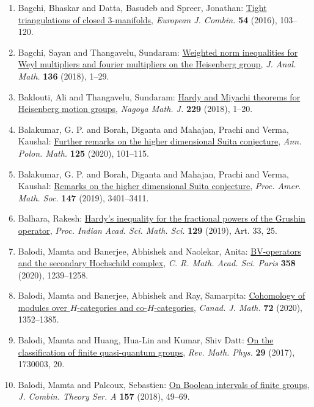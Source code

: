 \begin{enumerate}
\item Bagchi, Bhaskar and Datta, Basudeb and Spreer, Jonathan: \href{https://doi.org/10.1016/j.ejc.2015.12.006}{Tight triangulations of closed 3-manifolds}, \emph{European J. Combin.} {\bf 54} (2016), 103--120.
\item Bagchi, Sayan and Thangavelu, Sundaram: \href{https://doi.org/10.1007/s11854-018-0053-8}{Weighted norm inequalities for {W}eyl multipliers and fourier
multipliers on the {H}eisenberg group}, \emph{J. Anal. Math.} {\bf 136} (2018), 1--29.
\item Baklouti, Ali and Thangavelu, Sundaram: \href{https://doi.org/10.1017/nmj.2016.58}{Hardy and {M}iyachi theorems for {H}eisenberg motion groups}, \emph{Nagoya Math. J.} {\bf 229} (2018), 1--20.
\item Balakumar, G. P. and Borah, Diganta and Mahajan, Prachi and
Verma, Kaushal: \href{https://doi.org/10.4064/ap200203-21-4}{Further remarks on the higher dimensional {S}uita conjecture}, \emph{Ann. Polon. Math.} {\bf 125} (2020), 101--115.
\item Balakumar, G. P. and Borah, Diganta and Mahajan, Prachi and
Verma, Kaushal: \href{https://doi.org/10.1090/proc/14421}{Remarks on the higher dimensional {S}uita conjecture}, \emph{Proc. Amer. Math. Soc.} {\bf 147} (2019), 3401--3411.
\item Balhara, Rakesh: \href{https://doi.org/10.1007/s12044-019-0471-2}{Hardy's inequality for the fractional powers of the {G}rushin
operator}, \emph{Proc. Indian Acad. Sci. Math. Sci.} {\bf 129} (2019), Art. 33, 25.
\item Balodi, Mamta and Banerjee, Abhishek and Naolekar, Anita: \href{https://doi.org/10.5802/crmath.157}{B{V}-operators and the secondary {H}ochschild complex}, \emph{C. R. Math. Acad. Sci. Paris} {\bf 358} (2020), 1239--1258.
\item Balodi, Mamta and Banerjee, Abhishek and Ray, Samarpita: \href{https://doi.org/10.4153/s0008414x19000403}{Cohomology of modules over {$H$}-categories and
co-{$H$}-categories}, \emph{Canad. J. Math.} {\bf 72} (2020), 1352--1385.
\item Balodi, Mamta and Huang, Hua-Lin and Kumar, Shiv Datt: \href{https://doi.org/10.1142/S0129055X17300035}{On the classification of finite quasi-quantum groups}, \emph{Rev. Math. Phys.} {\bf 29} (2017), 1730003, 20.
\item Balodi, Mamta and Palcoux, Sebastien: \href{https://doi.org/10.1016/j.jcta.2018.02.004}{On {B}oolean intervals of finite groups}, \emph{J. Combin. Theory Ser. A} {\bf 157} (2018), 49--69.

\end{enumerate}
